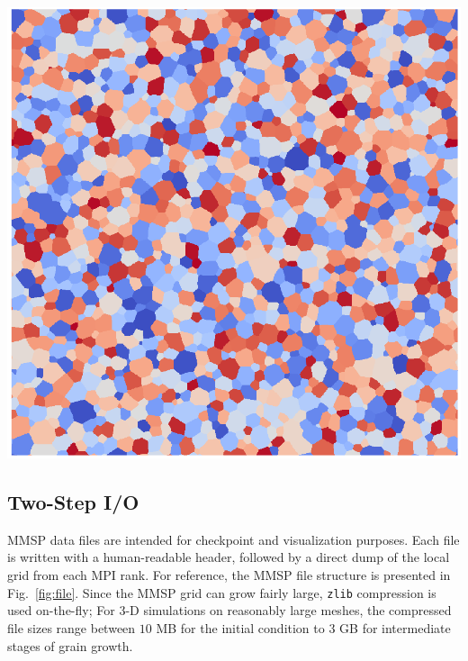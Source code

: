 \documentclass[11pt]{article}
\begin{document}
\begin{multicols*}{2}
\begin{center}\begin{minipage}{0.45\textwidth}\centering
  \includegraphics[width=\textwidth]{img/graingrowth}
\end{minipage}\end{center}

\subsection*{Two-Step I/O}
MMSP data files are intended for checkpoint and visualization purposes.
Each file is written with a human-readable header, followed by a direct dump of the local grid from each MPI rank.
For reference, the MMSP file structure is presented in Fig.~\ref{fig:file}.
Since the MMSP grid can grow fairly large, \texttt{zlib} compression is used on-the-fly;
For 3-D simulations on reasonably large meshes, the compressed file sizes range between $10$ MB for the initial condition to $3$ GB for intermediate stages of grain growth.


\end{multicols*}
\end{document}
